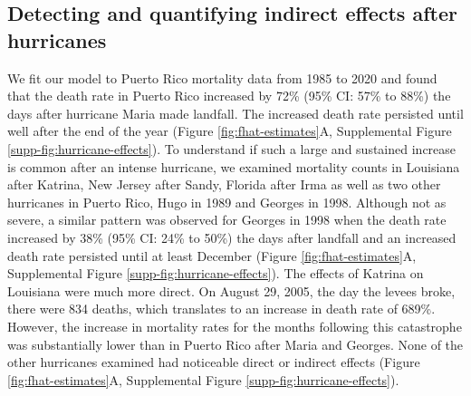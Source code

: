 \documentclass[11pt]{article}
\begin{document}
\subsection{Detecting and quantifying indirect effects after hurricanes}
\label{subsec:effects}
We fit our model to Puerto Rico mortality data from 1985 to 2020 and found that the death rate in Puerto Rico increased by 72\% (95\% CI: 57\% to 88\%) the days after hurricane Maria made landfall. The increased death rate persisted until well after the end of the year (Figure \ref{fig:fhat-estimates}A, Supplemental Figure \ref{supp-fig:hurricane-effects}). To understand if such a large and sustained increase is common after an intense hurricane, we examined mortality counts in Louisiana after Katrina, New Jersey after Sandy, Florida after Irma as well as two other hurricanes in Puerto Rico, Hugo in 1989 and Georges in 1998.  Although not as severe, a similar pattern was observed for Georges in 1998 when the death rate increased by 38\% (95\% CI: 24\% to 50\%) the days after landfall and an increased death rate persisted until at least December (Figure \ref{fig:fhat-estimates}A, Supplemental Figure \ref{supp-fig:hurricane-effects}). The effects of Katrina on Louisiana were much more direct. On August 29, 2005, the day the levees broke, there were 834 deaths, which translates to an increase in death rate of 689\%. However, the increase in mortality rates for the months following this catastrophe was substantially lower than in Puerto Rico after Maria and Georges. None of the other hurricanes examined had noticeable direct or indirect effects (Figure \ref{fig:fhat-estimates}A, Supplemental Figure \ref{supp-fig:hurricane-effects}).
\end{document}
